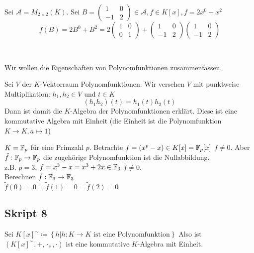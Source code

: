 \begin{subexample}
	Sei $ \mathcal{A}  = M_{2 \times 2} (K) $.
	Sei $ B = \begin{pmatrix} 1 & 0 \\ -1 & 2 \end{pmatrix} \in \mathcal{A} , f \in K[x], f = 2 x^0 + x^2 $ 
	\[
		f(B) = 2 B^0 + B^2 = 2 \begin{pmatrix} 1 & 0 \\ 0 & 1 \end{pmatrix} + \begin{pmatrix} 1 & 0 \\ -1 & 2 \end{pmatrix} \begin{pmatrix} 1 & 0 \\ -1 & 2 \end{pmatrix} 
	\]
\end{subexample}
~\par
Wir wollen die Eigenschaften von Polynomfunktionen zusammenfassen.

\setcounter{subenvironmentnumber}{9}
\begin{subtheorem}
	Sei $ V $ der $ K $-Vektorraum Polynomfunktionen.
	Wir versehen $ V $ mit punktweise Multiplikation: $ h_1, h_2 \in V $ und $ t \in K $ 
	\[
		(h_1 h_2)(t) = h_1(t) h_2(t)
	\]
	Dann ist damit die $ K $-Algebra der Polynomfunktionen erklärt.
	Diese ist eine kommutative Algebra mit Einheit (die Einheit ist die Polynomfunktion $ K \to K , a \mapsto 1 $)
\end{subtheorem}

\begin{subexample}
	$ K = \mathbb{F}_p $ für eine Primzahl $ p $.
	Betrachte $ f = (x^p - x) \in K[x] = \mathbb{F}_p[x] $ $ f \neq 0 $.
	Aber $ \tilde{f} : \mathbb{F}_p \to \mathbb{F}_p $ die zugehörige Polynomfunktion ist die Nullabbildung.\\
	z.B. $ p = 3 $, $ f = x^3 - x = x^3 + 2x \in \mathbb{F}_3 $ $ f \neq 0 $.\\
	Berechnen $ \tilde{f} : \mathbb{F}_3 \to \mathbb{F}_3 $\\
	$ \tilde{f}(0) = 0 = \tilde{f}(1) = 0 =  \tilde{f}(2) = 0 $
\end{subexample}

\subsection{Skript 8}
\setcounter{subenvironmentnumber}{-1}
\begin{subdefinition}[Bezeichnung]
	Sei $ K[x]^{\sim} \coloneqq \left\{ h | h : K \to K \text{ ist eine Polynomfunktion}  \right\}  $
	Also ist $ \left( K[x]^\sim, + , \cdot _c, \cdot  \right)  $ ist eine kommutative $ K $-Algebra mit Einheit.
\end{subdefinition}

